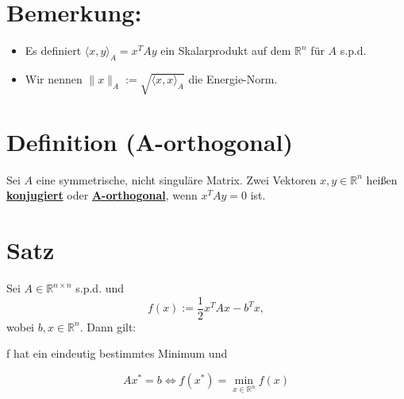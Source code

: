 \documentclass{article}
\begin{document}
\section{Bemerkung:}
\begin{itemize}
\item Es definiert $\langle x,y \rangle _{A} = x^{T}Ay$ ein Skalarprodukt auf dem $\mathbb{R}^{n}$ für $A$ s.p.d.
\item Wir nennen $\|x\|_{A} := \sqrt{\langle x, x \rangle _{A}}$ die Energie-Norm.
\end{itemize}

\section{Definition (A-orthogonal)}
Sei $A$ eine symmetrische, nicht singuläre Matrix. Zwei Vektoren $x,y \in \mathbb{R}^{n}$ heißen \underline{\textbf{konjugiert}} oder \underline{\textbf{A-orthogonal}}, wenn $x^{T}Ay = 0$ ist.

\section{Satz}
Sei $A\in\mathbb{R}^{n \times n}$ s.p.d. und
\begin{equation}
f(x) := \frac 1 2 x^{T}Ax - b^{T}x,
\end{equation}
wobei $b,x \in \mathbb{R}^{n}$. Dann gilt:
\begin{center}
f hat ein eindeutig bestimmtes Minimum und
\end{center}
\begin{equation}
Ax^{*} = b \Longleftrightarrow f(x^{*}) = \underset{x\in\mathbb{R}^{n}}{\min} f(x)
\end{equation}
\end{document}
